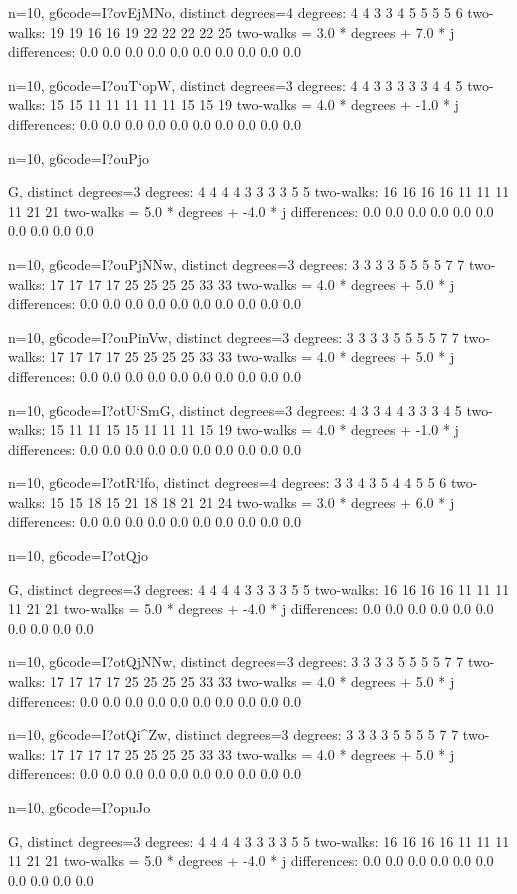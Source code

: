 {{{{{{{{{{{{n=10, g6code=I?ovEjMNo, distinct degrees=4
degrees: 4 4 3 3 4 5 5 5 5 6 
two-walks: 19 19 16 16 19 22 22 22 22 25 
two-walks = 3.0 * degrees + 7.0 * j
differences: 0.0 0.0 0.0 0.0 0.0 0.0 0.0 0.0 0.0 0.0 

n=10, g6code=I?ouT`opW, distinct degrees=3
degrees: 4 4 3 3 3 3 3 4 4 5 
two-walks: 15 15 11 11 11 11 11 15 15 19 
two-walks = 4.0 * degrees + -1.0 * j
differences: 0.0 0.0 0.0 0.0 0.0 0.0 0.0 0.0 0.0 0.0 

n=10, g6code=I?ouPjo{G, distinct degrees=3
degrees: 4 4 4 4 3 3 3 3 5 5 
two-walks: 16 16 16 16 11 11 11 11 21 21 
two-walks = 5.0 * degrees + -4.0 * j
differences: 0.0 0.0 0.0 0.0 0.0 0.0 0.0 0.0 0.0 0.0 

n=10, g6code=I?ouPjNNw, distinct degrees=3
degrees: 3 3 3 3 5 5 5 5 7 7 
two-walks: 17 17 17 17 25 25 25 25 33 33 
two-walks = 4.0 * degrees + 5.0 * j
differences: 0.0 0.0 0.0 0.0 0.0 0.0 0.0 0.0 0.0 0.0 

n=10, g6code=I?ouPinVw, distinct degrees=3
degrees: 3 3 3 3 5 5 5 5 7 7 
two-walks: 17 17 17 17 25 25 25 25 33 33 
two-walks = 4.0 * degrees + 5.0 * j
differences: 0.0 0.0 0.0 0.0 0.0 0.0 0.0 0.0 0.0 0.0 

n=10, g6code=I?otU`SmG, distinct degrees=3
degrees: 4 3 3 4 4 3 3 3 4 5 
two-walks: 15 11 11 15 15 11 11 11 15 19 
two-walks = 4.0 * degrees + -1.0 * j
differences: 0.0 0.0 0.0 0.0 0.0 0.0 0.0 0.0 0.0 0.0 

n=10, g6code=I?otR`lfo, distinct degrees=4
degrees: 3 3 4 3 5 4 4 5 5 6 
two-walks: 15 15 18 15 21 18 18 21 21 24 
two-walks = 3.0 * degrees + 6.0 * j
differences: 0.0 0.0 0.0 0.0 0.0 0.0 0.0 0.0 0.0 0.0 

n=10, g6code=I?otQjo{G, distinct degrees=3
degrees: 4 4 4 4 3 3 3 3 5 5 
two-walks: 16 16 16 16 11 11 11 11 21 21 
two-walks = 5.0 * degrees + -4.0 * j
differences: 0.0 0.0 0.0 0.0 0.0 0.0 0.0 0.0 0.0 0.0 

n=10, g6code=I?otQjNNw, distinct degrees=3
degrees: 3 3 3 3 5 5 5 5 7 7 
two-walks: 17 17 17 17 25 25 25 25 33 33 
two-walks = 4.0 * degrees + 5.0 * j
differences: 0.0 0.0 0.0 0.0 0.0 0.0 0.0 0.0 0.0 0.0 

n=10, g6code=I?otQi^Zw, distinct degrees=3
degrees: 3 3 3 3 5 5 5 5 7 7 
two-walks: 17 17 17 17 25 25 25 25 33 33 
two-walks = 4.0 * degrees + 5.0 * j
differences: 0.0 0.0 0.0 0.0 0.0 0.0 0.0 0.0 0.0 0.0 

n=10, g6code=I?opuJo{G, distinct degrees=3
degrees: 4 4 4 4 3 3 3 3 5 5 
two-walks: 16 16 16 16 11 11 11 11 21 21 
two-walks = 5.0 * degrees + -4.0 * j
differences: 0.0 0.0 0.0 0.0 0.0 0.0 0.0 0.0 0.0 0.0 

}}}}}}}}}}}}}}}
